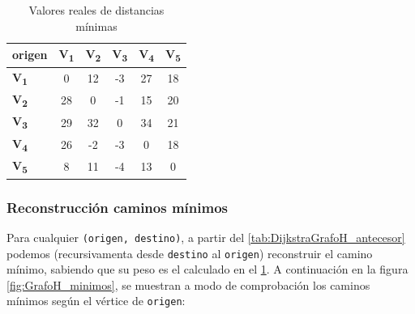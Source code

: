 \documentclass[../tp2_grupo404.tex]{subfiles}
\begin{document}
\begin{table}[H]
    \centering
    \begin{tabular}{@{}lccccc@{}}
    \toprule
    \textbf{origen} & \textbf{V\textsubscript{1}} & \textbf{V\textsubscript{2}} & \textbf{V\textsubscript{3}} & \textbf{V\textsubscript{4}} & \textbf{V\textsubscript{5}} \\ \midrule
    \textbf{V\textsubscript{1}}  &  0  & 12  & -3  & 27  & 18  \\
    \textbf{V\textsubscript{2}}  & 28  &  0  & -1  & 15  & 20  \\
    \textbf{V\textsubscript{3}}  & 29  & 32  &  0  & 34  & 21  \\
    \textbf{V\textsubscript{4}}  & 26  & -2  & -3  &  0  & 18  \\
    \textbf{V\textsubscript{5}}  &  8  & 11  & -4  & 13  &  0  \\ \bottomrule
    \end{tabular}
    \caption{Valores reales de distancias mínimas}
    \label{tab:AjusteJohnson_valores}
\end{table}
    
\subsubsection{Reconstrucción caminos mínimos}\label{sec:parte1_4_4}

Para cualquier \texttt{(origen, destino)}, a partir del \cref{tab:DijkstraGrafoH_antecesor}
podemos (recursivamenta desde \texttt{destino} al \texttt{origen})
reconstruir el camino mínimo, sabiendo que su peso es el calculado
en el \cref{tab:AjusteJohnson_valores}. A continuación en la figura
\cref{fig:GrafoH_minimos}, se muestran a modo de comprobación los
caminos mínimos según el vértice de \texttt{origen}:
\end{document}
